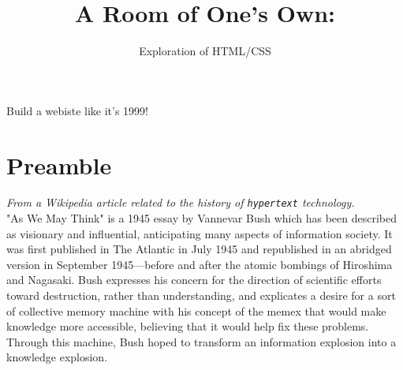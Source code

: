 \documentclass{42-en}
\begin{document}
\title{A Room of One's Own:}
\subtitle{Exploration of HTML/CSS}


\summary
{
Build a webiste like it's 1999!
}

\maketitle

\tableofcontents



\chapter{Preamble}

\textit{From a Wikipedia article related to the history of \texttt{hypertext} technology.}\\

"As We May Think" is a 1945 essay by Vannevar Bush which has been described as visionary and 
influential, anticipating many aspects of information society. It was first published in The 
Atlantic in July 1945 and republished in an abridged version in September 1945—before and after 
the atomic bombings of Hiroshima and Nagasaki. Bush expresses his concern for the direction of 
scientific efforts toward destruction, rather than understanding, and explicates a desire for a 
sort of collective memory machine with his concept of the memex that would make knowledge more 
accessible, believing that it would help fix these problems. Through this machine, Bush hoped to 
transform an information explosion into a knowledge explosion.\\
\end{document}
